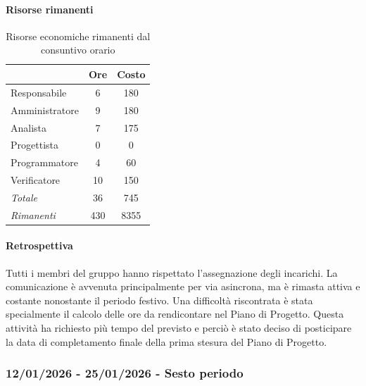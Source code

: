 \documentclass[a4paper,12pt]{article}
\begin{document}
            \paragraph{Risorse rimanenti}
                \begin{table}[H]
                \centering
                \caption{Risorse economiche rimanenti dal consuntivo orario}
                \begin{tabular}{|l|c|c|}
                \hline
                    \rowcolor{lightgray}{\textbf{Ruolo}} & {\textbf{Ore}} & {\textbf{Costo}}\\
                \hline
                    Responsabile & 6 & 180\\
                \hline
                    Amministratore & 9 & 180\\
                \hline
                    Analista & 7 & 175\\
                \hline
                    Progettista & 0 & 0\\
                \hline
                    Programmatore & 4 & 60\\
                \hline
                    Verificatore & 10 & 150\\
                \hline
                    \rowcolor{lightgray}\textit{Totale} & 36 & 745\\
                \hline
                    \rowcolor{lightgray}\textit{Rimanenti} & 430 & 8355\\
                \hline
                \end{tabular}
                \end{table}
                
            \paragraph{Retrospettiva}
            Tutti i membri del gruppo hanno rispettato l'assegnazione degli incarichi. La comunicazione è avvenuta principalmente per via asincrona, ma è rimasta attiva e costante nonostante il periodo festivo. Una difficoltà riscontrata è stata specialmente il calcolo delle ore da rendicontare nel Piano di Progetto. Questa attività ha richiesto più tempo del previsto e perciò è stato deciso di posticipare la data di completamento finale della prima stesura del Piano di Progetto.

        \subsubsection{12/01/2026 - 25/01/2026 - Sesto periodo}
\end{document}
